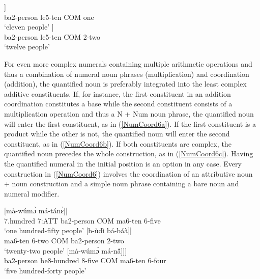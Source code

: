 \begin{exe}
\ex\label{NumCoord5}
\begin{xlist}
\ex \label{NumCoord5b}
  \gll     [b-ùdì [lè-wúmɔ̀ {\bfseries ná} vúdũ̂]] \\
                ba2-person le5-ten COM one \\
    \trans `eleven people'
\ex\label{NumCoordb2}
 \gll   [b-ùdì [lè-wúmɔ̀ {\bfseries ná} bá-báà]] \\
                ba2-person le5-ten COM 2-two \\
    \trans `twelve people'
\end {xlist}
\end {exe}

For even more complex numerals containing multiple arithmetic operations and thus a combination of numeral noun phrases (multiplication) and coordination (addition), the quantified noun is preferably integrated into the least complex additive constituents. If, for instance, the first constituent in an addition coordination constitutes a base while the second constituent consists of a multiplication operation and thus a N + Num noun phrase, the quantified noun will enter the first constituent, as in (\ref{NumCoord6a}). If the first constituent is a product while the other is not, the quantified noun will enter the second constituent, as in (\ref{NumCoord6b}). If both constituents are complex, the quantified noun precedes the whole construction, as in (\ref{NumCoord6c}). Having the quantified numeral in the initial position is an option in any case. Every construction in (\ref{NumCoord6}) involves the coordination of an attributive noun + noun construction and a simple noun phrase containing a bare noun and numeral modifier.

\begin{exe}
\ex\label{NumCoord6}
\begin{xlist}
\ex \label{NumCoord6a}
  \gll   [[bwúyà yá b-ùdì] {\bfseries ná} [mà-wúmɔ̀ má-tánɛ̀]] \\
                7.hundred 7:ATT ba2-person COM ma6-ten 6-five \\
    \trans `one hundred-fifty people'
\ex\label{NumCoord6b}
 \gll   [[mà-wúmɔ̀ má-báà] {\bfseries ná} [b-ùdì bá-báà]] \\
                ma6-ten 6-two COM ba2-person 2-two \\
    \trans `twenty-two people'
\ex\label{NumCoord6c}
 \gll   [b-ùdì [[bì-bwúyà bé-tánɛ̀] {\bfseries ná} [mà-wúmɔ̀ má-nã̂]]] \\
                ba2-person be8-hundred 8-five COM ma6-ten 6-four \\
    \trans `five hundred-forty people'
\end {xlist}
\end {exe}

